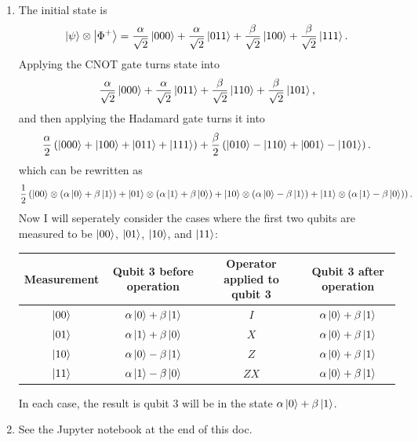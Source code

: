 \documentclass{article}
\begin{document}
\bigskip
\begin{prob}
\end{prob}
\begin{enumerate}[label=(\alph*)]
    \item The initial state is
        \[ \ket{\psi} \otimes \ket{\Phi^+} = \frac{\alpha}{\sqrt{2}} \ket{000} + \frac{\alpha}{\sqrt{2}} \ket{011} + \frac{\beta}{\sqrt{2}} \ket{100} + \frac{\beta}{\sqrt{2}} \ket{111}. \]
        Applying the CNOT gate turns state into
        \[ \frac{\alpha}{\sqrt{2}} \ket{000} + \frac{\alpha}{\sqrt{2}} \ket{011} + \frac{\beta}{\sqrt{2}} \ket{110} + \frac{\beta}{\sqrt{2}} \ket{101}, \]
        and then applying the Hadamard gate turns it into
        \[ \frac{\alpha}{2} \left( \ket{000}+\ket{100} + \ket{011}+\ket{111} \right) + \frac{\beta}{2} \left( \ket{010}-\ket{110} + \ket{001}-\ket{101} \right). \]
        which can be rewritten as
        \[ \frac{1}{2} \left( \ket{00} \otimes \left( \alpha \ket{0} + \beta \ket{1} \right) + \ket{01} \otimes \left( \alpha \ket{1} + \beta \ket{0} \right) + \ket{10} \otimes \left( \alpha \ket{0} - \beta \ket{1} \right) + \ket{11} \otimes \left( \alpha \ket{1} - \beta \ket{0} \right) \right). \]
        Now I will seperately consider the cases where the first two qubits are measured to be $\ket{00}$, $\ket{01}$, $\ket{10}$, and $\ket{11}$:
        \par
        \begin{center}
        \begin{tabular}{|c|c|c|c|}
            \hline
            Measurement & Qubit 3 before operation & Operator applied to qubit 3 & Qubit 3 after operation \\
            \hline
            \hline
            $\ket{00}$ & $\alpha \ket{0} + \beta \ket{1}$ & $I$ & $\alpha \ket{0} + \beta \ket{1}$ \\
            $\ket{01}$ & $\alpha \ket{1} + \beta \ket{0}$ & $X$ & $\alpha \ket{0} + \beta \ket{1}$ \\
            $\ket{10}$ & $\alpha \ket{0} - \beta \ket{1}$ & $Z$ & $\alpha \ket{0} + \beta \ket{1}$ \\
            $\ket{11}$ & $\alpha \ket{1} - \beta \ket{0}$ & $ZX$ & $\alpha \ket{0} + \beta \ket{1}$ \\
            \hline
        \end{tabular}
        \end{center}
        In each case, the result is qubit 3 will be in the state $\alpha \ket{0} + \beta \ket{1}$.
    \item See the Jupyter notebook at the end of this doc.
\end{enumerate}
\end{document}
